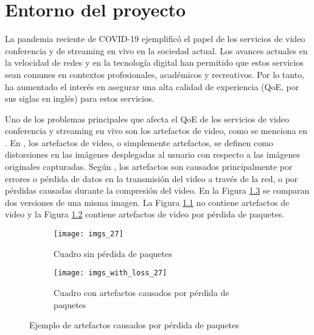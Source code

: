 
\chapter{Entorno del proyecto}
\label{chp:entorno}

La pandemia reciente de COVID-19 ejemplificó el papel de los servicios de video conferencia y de streaming en vivo en la sociedad actual.
Los avances actuales en la velocidad de redes y en la tecnología digital han permitido que estos servicios sean comunes en contextos profesionales, académicos y recreativos.
Por lo tanto, ha aumentado el interés en asegurar una alta calidad de experiencia (QoE, por sus siglas en inglés) para estos servicios.

Uno de los problemas principales que afecta el QoE de los servicios de video conferencia y streaming en vivo son los artefactos de video, como se menciona en \cite{Vranjes2018, Korhonen2018}.
En \cite{Greengrass2009}, los artefactos de video, o simplemente artefactos, se definen como distorsiones en las imágenes desplegadas al usuario con respecto a las imágenes originales capturadas.
Según \cite{Vranjes2018}, los artefactos son causados principalmente por errores o pérdida de datos en la transmisión del video a través de la red, o por pérdidas causadas durante la compresión del video. En la Figura \ref{fig:1.1} se comparan dos versiones de una misma imagen. La Figura \ref{fig:1.1.a} no contiene artefactos de video y la Figura \ref{fig:1.1.b} contiene artefactos de video por pérdida de paquetes.

\begin{figure} [!h]
  \centering
  
  \begin{subfigure}[t]{0.49\textwidth}
    \centering
    \texttt{[image: imgs\_27]}
    \caption{Cuadro sin pérdida de paquetes}
    \label{fig:1.1.a}
  \end{subfigure}
  \hfill
  \begin{subfigure}[t]{0.49\textwidth}
    \centering
    \texttt{[image: imgs\_with\_loss\_27]}
    \caption{Cuadro con artefactos causados por pérdida de paquetes}
    \label{fig:1.1.b}
  \end{subfigure}
  
  \caption{Ejemplo de artefactos causados por pérdida de paquetes}
  \label{fig:1.1}

\end{figure}


